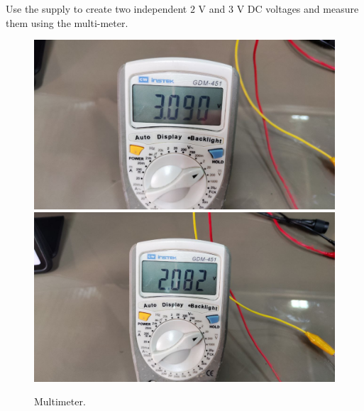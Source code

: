 \documentclass[11pt]{article}
\begin{document}
\begin{question}
\begin{subquestion}{Use the supply to create two independent $2$ V and $3$ V DC voltages and measure them using the multi-meter.}
{            \begin{figure}[H]
                \begin{center}
                    \includegraphics[scale=0.1]{Fig/39.jpeg}
                    \includegraphics[scale=0.1]{Fig/40.jpeg}
                    \caption{Multimeter.}
                \end{center}
            \end{figure}
        }
    \end{subquestion}


\end{question}
\end{document}
